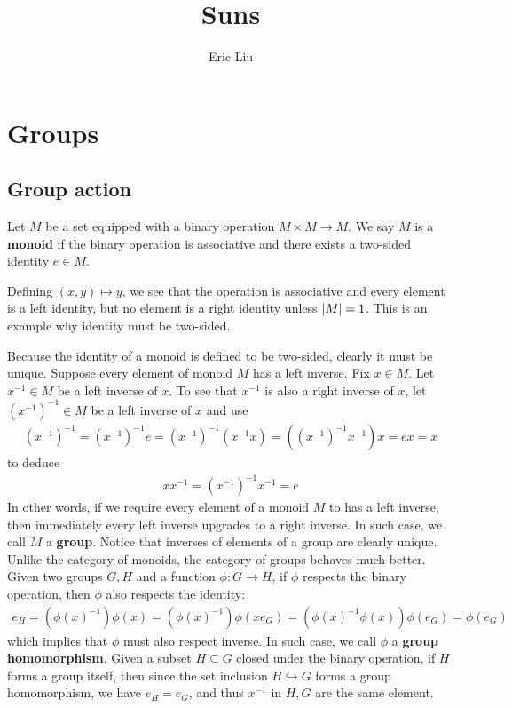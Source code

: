 \documentclass{report}
\title{Suns}
\author{Eric Liu}
\date{}
\begin{document}
\maketitle
\newpage %

\tableofcontents
\pagebreak
\chapter{Groups}

\section{Group action}
Let $M$ be a set equipped with a binary operation $M\times M \rightarrow M$. We say $M$ is a \textbf{monoid} if the binary operation is associative and there exists a two-sided identity $e \in M$. 
\begin{example}
Defining $(x,y)\mapsto y$, we see that the operation is associative and every element is a left identity, but no element is a right identity unless $\left|M\right|=1$. This is an example why identity must be two-sided. 
\end{example}
Because the identity of a monoid is defined to be two-sided, clearly it must be unique.  Suppose every element of monoid $M$ has a left inverse. Fix $x \in M$. Let $x^{-1}\in M$ be a left inverse of $x$. To see that  $x^{-1}$ is also a right inverse of $x$, let  $(x^{-1})^{-1}\in M$ be a left inverse of $x$ and use  
\begin{align*}
  (x^{-1})^{-1}=(x^{-1})^{-1}e=(x^{-1})^{-1}(x^{-1}x)= ((x^{-1})^{-1}x^{-1})x= ex=x
\end{align*}
to deduce
\begin{align*}
xx^{-1}=(x^{-1})^{-1}x^{-1}= e
\end{align*}
In other words, if we require every element of a monoid $M$ to has a left inverse, then immediately every left inverse upgrades to a right inverse. In such case, we call $M$ a  \textbf{group}. Notice that inverses of elements of a group are clearly unique. \\


Unlike the category of monoids, the category of groups behaves much better. Given two groups $G,H$ and a function  $\phi : G\rightarrow H$, if $\phi$ respects the binary operation, then $\phi$ also respects the identity:
\begin{align*}
e_H = (\phi (x)^{-1})\phi (x) = (\phi(x)^{-1}) \phi(x e_G) =  (\phi (x)^{-1} \phi (x)) \phi (e_G)=\phi (e_G)
\end{align*}
which implies that $\phi$ must also respect inverse. In such case, we call $\phi$ a \textbf{group homomorphism}. Given a subset $H \subseteq G$ closed under the binary operation, if $H$ forms a group itself, then since the set inclusion $H \hookrightarrow G$ forms a group homomorphism, we have $e_H=e_G$, and thus $x^{-1}$ in $H,G$ are the same element. \\
 
\end{document}
